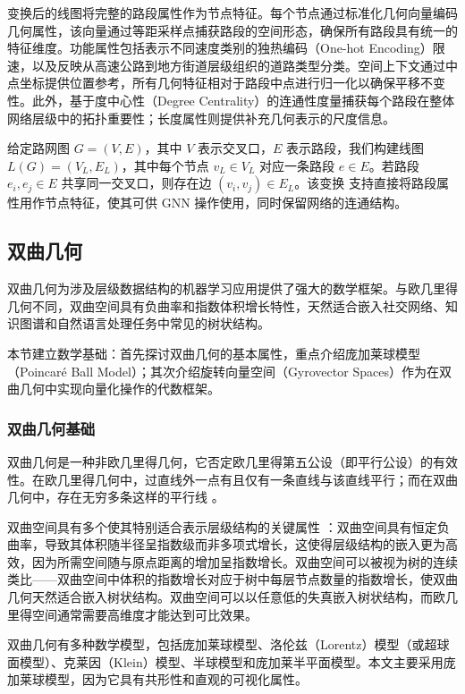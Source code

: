 变换后的线图将完整的路段属性作为节点特征。每个节点通过标准化几何向量编码几何属性，该向量通过等距采样点捕获路段的空间形态，确保所有路段具有统一的特征维度。功能属性包括表示不同速度类别的独热编码（One-hot Encoding）限速，以及反映从高速公路到地方街道层级组织的道路类型分类。空间上下文通过中点坐标提供位置参考，所有几何特征相对于路段中点进行归一化以确保平移不变性。此外，基于度中心性（Degree Centrality）的连通性度量捕获每个路段在整体网络层级中的拓扑重要性；长度属性则提供补充几何表示的尺度信息。

给定路网图 $G = (V, E)$，其中 $V$ 表示交叉口，$E$ 表示路段，我们构建线图 $L(G) = (V_L, E_L)$，其中每个节点 $v_L \in V_L$ 对应一条路段 $e \in E$。若路段 $e_i, e_j \in E$ 共享同一交叉口，则存在边 $(v_i, v_j) \in E_L$。该变换 \cite{Gharaee2021} 支持直接将路段属性用作节点特征，使其可供 GNN 操作使用，同时保留网络的连通结构。

\subsection{双曲几何}

双曲几何为涉及层级数据结构的机器学习应用提供了强大的数学框架。与欧几里得几何不同，双曲空间具有负曲率和指数体积增长特性，天然适合嵌入社交网络、知识图谱和自然语言处理任务中常见的树状结构。

本节建立数学基础：首先探讨双曲几何的基本属性，重点介绍庞加莱球模型（Poincar\'e Ball Model）；其次介绍旋转向量空间（Gyrovector Spaces）作为在双曲几何中实现向量化操作的代数框架。

\subsubsection{双曲几何基础}

双曲几何是一种非欧几里得几何，它否定欧几里得第五公设（即平行公设）的有效性。在欧几里得几何中，过直线外一点有且仅有一条直线与该直线平行；而在双曲几何中，存在无穷多条这样的平行线 \cite{Sarkar2011,Nickel2017}。

双曲空间具有多个使其特别适合表示层级结构的关键属性 \cite{Sala2018}：双曲空间具有恒定负曲率，导致其体积随半径呈指数级而非多项式增长，这使得层级结构的嵌入更为高效，因为所需空间随与原点距离的增加呈指数增长。双曲空间可以被视为树的连续类比——双曲空间中体积的指数增长对应于树中每层节点数量的指数增长，使双曲几何天然适合嵌入树状结构。双曲空间可以以任意低的失真嵌入树状结构，而欧几里得空间通常需要高维度才能达到可比效果。

双曲几何有多种数学模型，包括庞加莱球模型、洛伦兹（Lorentz）模型（或超球面模型）、克莱因（Klein）模型、半球模型和庞加莱半平面模型。本文主要采用庞加莱球模型，因为它具有共形性和直观的可视化属性。

